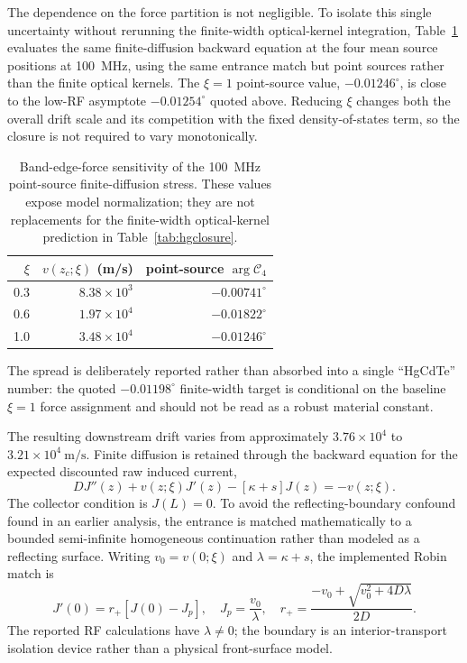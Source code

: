 \documentclass[11pt]{article}
\begin{document}
The dependence on the force partition is not negligible.  To isolate this single uncertainty without rerunning the finite-width optical-kernel integration, Table~\ref{tab:hg_xi_sweep} evaluates the same finite-diffusion backward equation at the four mean source positions at \SI{100}{MHz}, using the same entrance match but point sources rather than the finite optical kernels.  The $\xi=1$ point-source value, $-0.01246^\circ$, is close to the low-RF asymptote $-0.01254^\circ$ quoted above.  Reducing $\xi$ changes both the overall drift scale and its competition with the fixed density-of-states term, so the closure is not required to vary monotonically.
\begin{table}[H]
\centering
\caption{Band-edge-force sensitivity of the \SI{100}{MHz} point-source finite-diffusion stress.  These values expose model normalization; they are not replacements for the finite-width optical-kernel prediction in Table~\ref{tab:hgclosure}.}
\label{tab:hg_xi_sweep}
\begin{tabular}{rrr}
\toprule
$\xi$ & $v(z_c;\xi)$ (m/s) & point-source $\arg\mathcal C_4$ \\
\midrule
0.3 & $8.38\times10^3$ & $-0.00741^\circ$ \\
0.6 & $1.97\times10^4$ & $-0.01822^\circ$ \\
1.0 & $3.48\times10^4$ & $-0.01246^\circ$ \\
\bottomrule
\end{tabular}
\end{table}
The spread is deliberately reported rather than absorbed into a single ``HgCdTe'' number: the quoted $-0.01198^\circ$ finite-width target is conditional on the baseline $\xi=1$ force assignment and should not be read as a robust material constant.

The resulting downstream drift varies from approximately $3.76\times10^4$ to $3.21\times10^4\ \mathrm{m/s}$. Finite diffusion is retained through the backward equation for the expected discounted raw induced current,
\begin{equation}
\boxed{
D J''(z)+v(z;\xi)J'(z)-[\kappa+s]J(z)=-v(z;\xi).}
\label{eq:hgbvp}
\end{equation}
The collector condition is $J(L)=0$. To avoid the reflecting-boundary confound found in an earlier analysis, the entrance is matched mathematically to a bounded semi-infinite homogeneous continuation rather than modeled as a reflecting surface. Writing $v_0=v(0;\xi)$ and $\lambda=\kappa+s$, the implemented Robin match is
\begin{equation}
\boxed{J'(0)=r_+[J(0)-J_p],\quad J_p=\frac{v_0}{\lambda},\quad r_+=\frac{-v_0+\sqrt{v_0^2+4D\lambda}}{2D}.}
\label{eq:hg_robin}
\end{equation}
The reported RF calculations have $\lambda\neq0$; the boundary is an interior-transport isolation device rather than a physical front-surface model.
\end{document}
